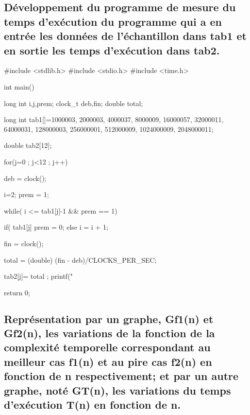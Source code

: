 \documentclass[12pt]{article}
\begin{document}
\subsection{Développement du programme de mesure du temps d'exécution du programme qui a en entrée les données de l'échantillon dans tab1 et en sortie les temps d'exécution dans tab2. }
\begin{sql}
#include <stdlib.h>
#include <stdio.h>
#include <time.h>

int main()
{
	long int i,j,prem;
	clock_t deb,fin;
	double total;

	long int tab1[]={1000003, 2000003,	4000037,	8000009,	16000057,	32000011,	64000031,
	128000003,	256000001,	512000009,	1024000009,	2048000011};

	double tab2[12];

for(j=0 ; j<12 ; j++)
{
	deb = clock();
	
	i=2;
	prem = 1;

	while( i <= tab1[j]-1 && prem == 1){

		if( tab1[j]%
			prem = 0;
		else
			i = i + 1;
	}
	fin = clock();

	total = (double) (fin - deb)/CLOCKS_PER_SEC;
	
	tab2[j]= total ;
	printf("%
}
return 0;

}

\end{sql}

\subsection{Représentation par un graphe, Gf1(n) et Gf2(n), les variations de la fonction de la complexité temporelle correspondant au meilleur cas f1(n) et au pire cas f2(n) en fonction de n respectivement; et par un autre graphe, noté GT(n), les variations  du temps d'exécution T(n) en fonction de n.}
\end{document}
